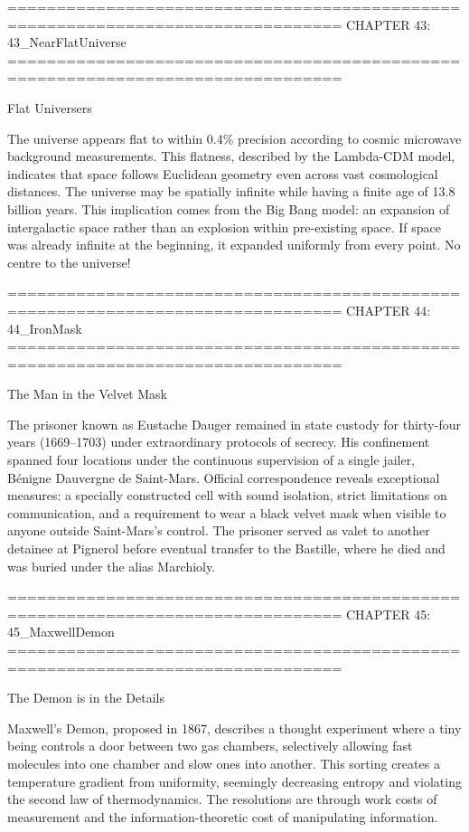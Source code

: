================================================================================
CHAPTER 43: 43_NearFlatUniverse
================================================================================

Flat Universers

The universe appears flat to within 0.4\% precision according to cosmic microwave background measurements. This flatness, described by the Lambda-CDM model, indicates that space follows Euclidean geometry even across vast cosmological distances. The universe may be spatially infinite while having a finite age of 13.8 billion years. This implication comes from the Big Bang model: an expansion of intergalactic space rather than an explosion within pre-existing space. If space was already infinite at the beginning, it expanded uniformly from every point. No centre to the universe!


================================================================================
CHAPTER 44: 44_IronMask
================================================================================

The Man in the Velvet Mask

The prisoner known as \QSOpen{}Eustache Dauger\QSClose{} remained in state custody for thirty-four years (1669–1703) under extraordinary protocols of secrecy. His confinement spanned four locations under the continuous supervision of a single jailer, Bénigne Dauvergne de Saint-Mars. Official correspondence reveals exceptional measures: a specially constructed cell with sound isolation, strict limitations on communication, and a requirement to wear a black velvet mask when visible to anyone outside Saint-Mars's control. The prisoner served as valet to another detainee at Pignerol before eventual transfer to the Bastille, where he died and was buried under the alias \QSOpen{}Marchioly.\QSClose{}


================================================================================
CHAPTER 45: 45_MaxwellDemon
================================================================================

The Demon is in the Details

Maxwell's Demon, proposed in 1867, describes a thought experiment where a tiny being controls a door between two gas chambers, selectively allowing fast molecules into one chamber and slow ones into another. This sorting creates a temperature gradient from uniformity, seemingly decreasing entropy and violating the second law of thermodynamics. The resolutions are through work costs of measurement and the information-theoretic cost of manipulating information.


